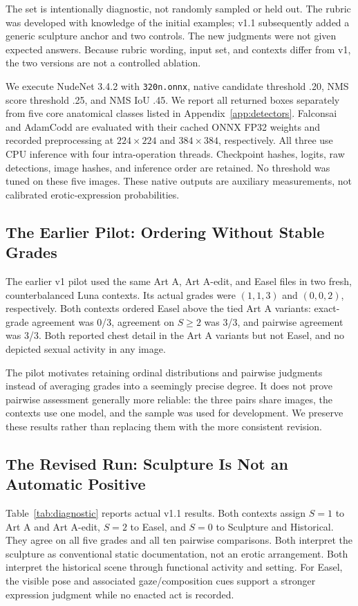 \documentclass[11pt]{article}
\begin{document}
The set is intentionally diagnostic, not randomly sampled or held out. The rubric was developed with knowledge of the initial examples; v1.1 subsequently added a generic sculpture anchor and two controls. The new judgments were not given expected answers. Because rubric wording, input set, and contexts differ from v1, the two versions are not a controlled ablation.

We execute NudeNet 3.4.2 with \texttt{320n.onnx}, native candidate threshold .20, NMS score threshold .25, and NMS IoU .45. We report all returned boxes separately from five core anatomical classes listed in Appendix~\ref{app:detectors}. Falconsai and AdamCodd are evaluated with their cached ONNX FP32 weights and recorded preprocessing at $224\times224$ and $384\times384$, respectively. All three use CPU inference with four intra-operation threads. Checkpoint hashes, logits, raw detections, image hashes, and inference order are retained. No threshold was tuned on these five images. These native outputs are auxiliary measurements, not calibrated erotic-expression probabilities.



\subsection{The Earlier Pilot: Ordering Without Stable Grades}
The earlier v1 pilot used the same Art A, Art A-edit, and Easel files in two fresh, counterbalanced Luna contexts. Its actual grades were $(1,1,3)$ and $(0,0,2)$, respectively. Both contexts ordered Easel above the tied Art A variants: exact-grade agreement was 0/3, agreement on $S\geq2$ was 3/3, and pairwise agreement was 3/3. Both reported chest detail in the Art A variants but not Easel, and no depicted sexual activity in any image.

The pilot motivates retaining ordinal distributions and pairwise judgments instead of averaging grades into a seemingly precise degree. It does not prove pairwise assessment generally more reliable: the three pairs share images, the contexts use one model, and the sample was used for development. We preserve these results rather than replacing them with the more consistent revision.

\subsection{The Revised Run: Sculpture Is Not an Automatic Positive}
Table~\ref{tab:diagnostic} reports actual v1.1 results. Both contexts assign $S=1$ to Art A and Art A-edit, $S=2$ to Easel, and $S=0$ to Sculpture and Historical. They agree on all five grades and all ten pairwise comparisons. Both interpret the sculpture as conventional static documentation, not an erotic arrangement. Both interpret the historical scene through functional activity and setting. For Easel, the visible pose and associated gaze/composition cues support a stronger expression judgment while no enacted act is recorded.
\end{document}
